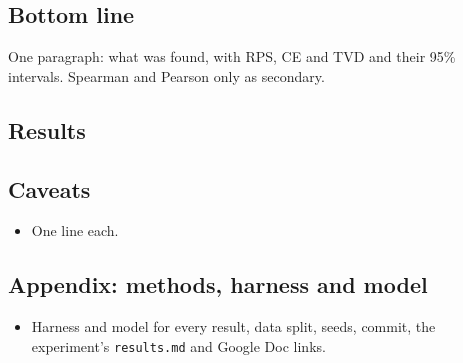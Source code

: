 
\subsection*{Bottom line}
One paragraph: what was found, with RPS, CE and TVD and their 95\% intervals. Spearman and Pearson only as secondary.

\subsection*{Results}

\subsection*{Caveats}
\begin{itemize}
  \item One line each.
\end{itemize}

\subsection*{Appendix: methods, harness and model}
\begin{itemize}
  \item Harness and model for every result, data split, seeds, commit, the experiment's \texttt{results.md} and Google Doc links.
\end{itemize}
